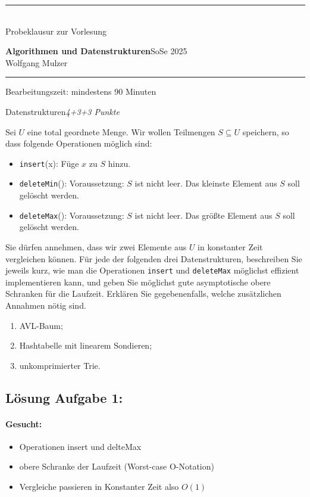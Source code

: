 \documentclass[a4paper,twoside,12pt]{article}
\newcounter{AUFGNR}
\newcommand{\AUFGABE}[2]{\vspace{0.3cm}\item[Aufgabe \arabic{AUFGNR}]\stepcounter{AUFGNR} #1\hfill\emph{#2}}
\begin{document}
\pagestyle{empty}
\hrule\medskip
\rule{0ex}{0ex}\\[-1ex]
Probeklausur zur Vorlesung

\smallskip
\noindent
\large
\textbf{Algorithmen und Datenstrukturen}\hfill SoSe 2025 \\[0.5ex]
\normalsize
Wolfgang Mulzer

\medskip\hrule

\smallskip
\noindent
Bearbeitungszeit: mindestens 90 Minuten

\vskip 0.5cm

\begin{description}

\AUFGABE{Datenstrukturen}{4+3+3 Punkte}

Sei $U$ eine total geordnete Menge. Wir wollen
Teilmengen $S \subseteq U$ speichern, so dass folgende Operationen
m\"oglich sind:
\begin{itemize}
  \item \texttt{insert}(x): Füge $x$ zu $S$ hinzu.
  \item \texttt{deleteMin}(): Voraussetzung: $S$ ist nicht leer. Das kleinste
	  Element aus $S$ soll gelöscht werden.
  \item \texttt{deleteMax}(): Voraussetzung: $S$ ist nicht leer.
	  Das größte Element aus $S$ soll gelöscht werden.
\end{itemize}
Sie dürfen annehmen, dass wir  zwei Elemente aus $U$ in 
konstanter Zeit vergleichen können. Für jede der folgenden drei
Datenstrukturen, beschreiben Sie jeweils kurz, wie man die 
Operationen \texttt{insert} und \texttt{deleteMax} 
möglichst effizient implementieren kann, und geben Sie möglichst
gute asymptotische obere Schranken für die Laufzeit.
Erklären Sie gegebenenfalls, welche zusätzlichen Annahmen nötig sind.

\begin{enumerate}
  \item AVL-Baum;
  \item Hashtabelle mit linearem Sondieren; 
  \item unkomprimierter Trie. 
\end{enumerate}

\newpage
\subsection*{Lösung Aufgabe 1:}
\paragraph{Gesucht:}
\begin{itemize}
	\item Operationen insert und delteMax
	\item obere Schranke der Laufzeit (Worst-case O-Notation)
	\item Vergleiche passieren in Konstanter Zeit also $O(1)$
\end{itemize}



\end{description}
\end{document}
